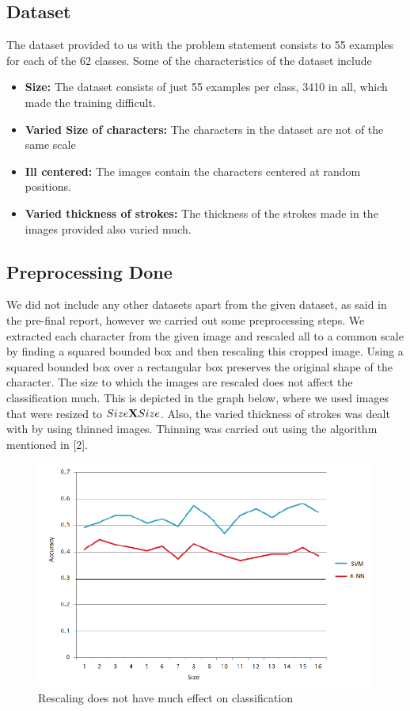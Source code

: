 \documentclass[conference]{IEEEtran}
\begin{document}
\subsection{Dataset}
The dataset provided to us with the problem statement consists to 55 examples for each of the 62 classes. Some of the characteristics of the dataset include
\begin{itemize}
\item{{\bf{Size:}} The dataset consists of just 55 examples per class, 3410 in all, which made the training difficult.}
\item{{\bf{Varied Size of characters:}} The characters in the dataset are not of the same scale}
\item{{\bf{Ill centered:}} The images contain the characters centered at random positions.}
\item{{\bf{Varied thickness of strokes:}} The thickness of the strokes made in the images provided also varied much.}
\end{itemize}
\subsection{Preprocessing Done}
We did not include any other datasets apart from the given dataset, as said in the pre-final report, however we carried out some preprocessing steps. We extracted each character from the given image and rescaled all to a common scale by finding a squared bounded box and then rescaling this cropped image. Using a squared bounded box over a rectangular box preserves the original shape of the character. The size to which the images are rescaled does not affect the classification much. This is depicted in the graph below, where we used images that were resized to $Size{\bf X}Size$. 
Also, the varied thickness of strokes was dealt with by using thinned images. Thinning was carried out using the algorithm mentioned in [2].

\begin{figure}[h]
  \centering
    \includegraphics[scale = 0.4]{Scale_eff.png}
  \caption{Rescaling does not have much effect on classification }
\end{figure}
\end{document}
